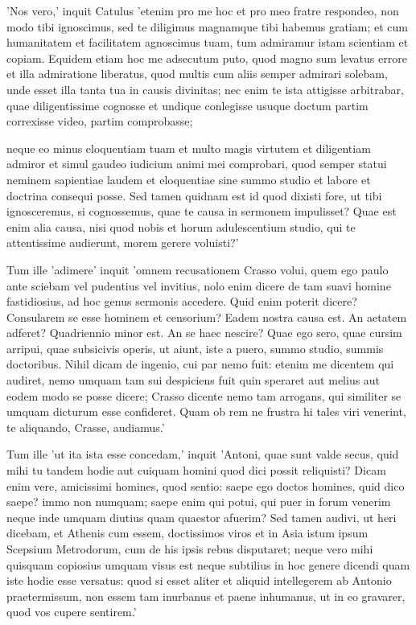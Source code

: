  'Nos vero,' inquit Catulus 'etenim pro me hoc et pro meo fratre respondeo, non modo tibi ignoscimus, sed te diligimus magnamque tibi habemus gratiam; et cum humanitatem et facilitatem agnoscimus tuam, tum admiramur istam scientiam et copiam. Equidem etiam hoc me adsecutum puto, quod magno sum levatus errore et illa admiratione liberatus, quod multis cum aliis semper admirari solebam, unde esset illa tanta tua in causis divinitas; nec enim te ista attigisse arbitrabar, quae diligentissime cognosse et undique conlegisse usuque doctum partim correxisse video, partim comprobasse;

 neque eo minus eloquentiam tuam et multo magis virtutem et diligentiam admiror et simul gaudeo iudicium animi mei comprobari, quod semper statui neminem sapientiae laudem et eloquentiae sine summo studio et labore et doctrina consequi posse. Sed tamen quidnam est id quod dixisti fore, ut tibi ignosceremus, si cognossemus, quae te causa in sermonem impulisset? Quae est enim alia causa, nisi quod nobis et horum adulescentium studio, qui te attentissime audierunt, morem gerere voluisti?'

 Tum ille 'adimere' inquit 'omnem recusationem Crasso volui, quem ego paulo ante sciebam vel pudentius vel invitius, nolo enim dicere de tam suavi homine fastidiosius, ad hoc genus sermonis accedere. Quid enim poterit dicere? Consularem se esse hominem et censorium? Eadem nostra causa est. An aetatem adferet? Quadriennio minor est. An se haec nescire? Quae ego sero, quae cursim arripui, quae subsicivis operis, ut aiunt, iste a puero, summo studio, summis doctoribus. Nihil dicam de ingenio, cui par nemo fuit: etenim me dicentem qui audiret, nemo umquam tam sui despiciens fuit quin speraret aut melius aut eodem modo se posse dicere; Crasso dicente nemo tam arrogans, qui similiter se umquam dicturum esse confideret. Quam ob rem ne frustra hi tales viri venerint, te aliquando, Crasse, audiamus.'

 Tum ille 'ut ita ista esse concedam,' inquit 'Antoni, quae sunt valde secus, quid mihi tu tandem hodie aut cuiquam homini quod dici possit reliquisti? Dicam enim vere, amicissimi homines, quod sentio: saepe ego doctos homines, quid dico saepe? immo non numquam; saepe enim qui potui, qui puer in forum venerim neque inde umquam diutius quam quaestor afuerim? Sed tamen audivi, ut heri dicebam, et Athenis cum essem, doctissimos viros et in Asia istum ipsum Scepsium Metrodorum, cum de his ipsis rebus disputaret; neque vero mihi quisquam copiosius umquam visus est neque subtilius in hoc genere dicendi quam iste hodie esse versatus: quod si esset aliter et aliquid intellegerem ab Antonio praetermissum, non essem tam inurbanus et paene inhumanus, ut in eo gravarer, quod vos cupere sentirem.'

